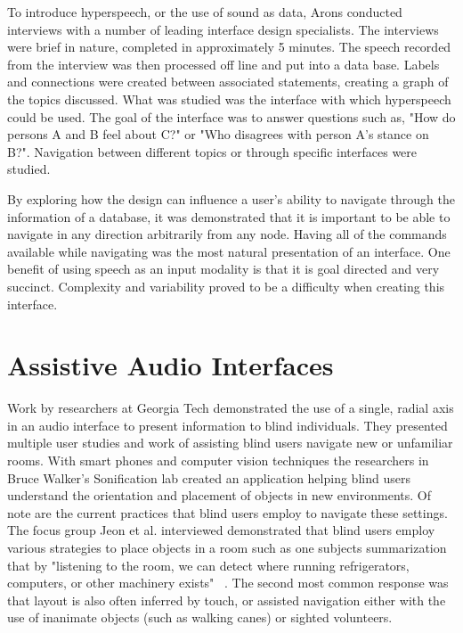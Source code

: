 To introduce hyperspeech, or the use of sound as data, Arons conducted interviews
with a number of leading interface design specialists.  The interviews were
brief in nature, completed in approximately 5 minutes.  The speech recorded
from the interview was then processed off line and put into a data base.
Labels and connections were created between associated statements, creating a
graph of the topics discussed.  What was studied was the interface with which
hyperspeech could be used.  The goal of the interface was to answer questions
such as, "How do persons A and B feel about C?" or "Who disagrees with person
A's stance on B?".  Navigation between different topics or through specific
interfaces were studied.

By exploring how the design can influence a user's ability to navigate through
the information of a database, it was demonstrated that it is important to
be able to navigate in any direction arbitrarily from any node. Having all of
the commands available while navigating was the most natural presentation of
an interface.  One benefit of using speech as an input modality is that it is
goal directed and very succinct.  Complexity and variability proved to be a
difficulty when creating this interface.

\section{                 Assistive Audio Interfaces                           }

Work by researchers at Georgia Tech demonstrated the use of a single, radial axis
in an audio interface to present information to blind individuals. They presented
multiple user studies and work of assisting blind users navigate new or unfamiliar
rooms.  With smart phones and computer vision techniques the researchers in
Bruce Walker's Sonification lab created an application helping blind users understand
the orientation and placement of objects in new environments. Of note are the
current practices that blind users employ to navigate these settings. The focus group
Jeon et al. interviewed demonstrated that blind users employ
various strategies to place objects in a room such as one subjects summarization
that by "listening to the room, we can detect where running refrigerators,
computers, or other machinery exists" ~\cite{jeon2012listen2droom}. The second
most common response was that layout is also often inferred by touch, or assisted
navigation either with the use of inanimate objects (such as walking canes)
or sighted volunteers.

